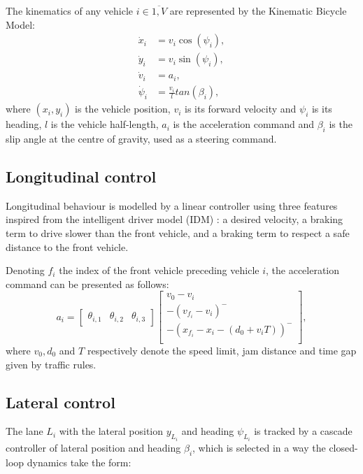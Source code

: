 \documentclass{article}
\begin{document}
The kinematics of any vehicle $i\in\overline{1,V}$ are represented by the Kinematic Bicycle Model:
\begin{align}
	\dot{x}_i &= v_i\cos(\psi_i), \nonumber\\
	\dot{y}_i &= v_i\sin(\psi_i), \nonumber\\
	\dot{v}_i &= a_i, \nonumber\\
	\dot{\psi}_i &= \frac{v_i}{l}tan(\beta_i), \nonumber
\end{align}
where $(x_i, y_i)$ is the vehicle position, $v_i$ is its forward velocity and $\psi_i$ is its heading, $l$ is the vehicle half-length, $a_i$ is the acceleration command and $\beta_i$ is the slip angle at the centre of gravity, used as a steering command.

\subsection{Longitudinal control}
Longitudinal behaviour is modelled by a linear controller using three features inspired from the intelligent driver model (IDM) \cite{Treiber2000}: a desired velocity, a braking term to drive slower than the front vehicle, and a braking term to respect a safe distance to the front vehicle.

Denoting $f_i$ the index of the front vehicle preceding vehicle $i$, the acceleration command can be presented as follows:
\begin{equation*}
	a_i = \begin{bmatrix}
	\theta_{i,1} & \theta_{i,2} & \theta_{i,3}
	\end{bmatrix} \begin{bmatrix}
		v_0 - v_i \\
		-(v_{f_i}-v_i)^- \\
		-(x_{f_i} - x_i - (d_0 + v_iT))^- \\
	\end{bmatrix},
	\label{eq:theta_a}
\end{equation*}
where $v_0, d_0$ and $T$ respectively denote the speed limit, jam distance and time gap given by traffic rules.

\subsection{Lateral control}

The lane $L_i$ with the lateral position $y_{L_i}$ and heading $\psi_{L_i}$ is tracked by a cascade controller of lateral position and heading $\beta_i$, which is selected in a way the closed-loop dynamics take the form:
\end{document}
